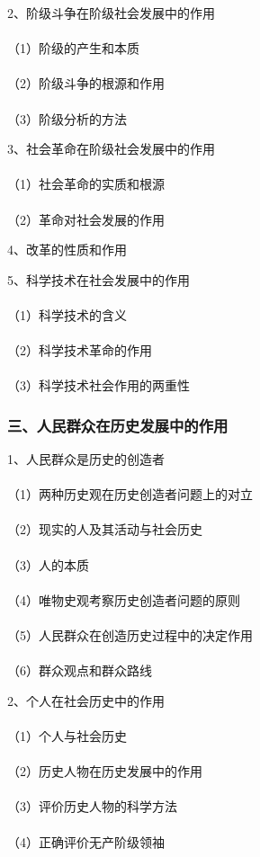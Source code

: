 \documentclass{ctexart}
\begin{document}
2、阶级斗争在阶级社会发展中的作用
\\\\
（1）阶级的产生和本质
\\\\
（2）阶级斗争的根源和作用
\\\\
（3）阶级分析的方法

3、社会革命在阶级社会发展中的作用
\\\\
（1）社会革命的实质和根源
\\\\
（2）革命对社会发展的作用

4、改革的性质和作用

5、科学技术在社会发展中的作用
\\\\
（1）科学技术的含义
\\\\
（2）科学技术革命的作用
\\\\
（3）科学技术社会作用的两重性
\subsubsection{三、人民群众在历史发展中的作用}
1、人民群众是历史的创造者
\\\\
（1）两种历史观在历史创造者问题上的对立
\\\\
（2）现实的人及其活动与社会历史
\\\\
（3）人的本质
\\\\
（4）唯物史观考察历史创造者问题的原则
\\\\
（5）人民群众在创造历史过程中的决定作用
\\\\
（6）群众观点和群众路线

2、个人在社会历史中的作用
\\\\
（1）个人与社会历史
\\\\
（2）历史人物在历史发展中的作用
\\\\
（3）评价历史人物的科学方法
\\\\
（4）正确评价无产阶级领袖
\end{document}
